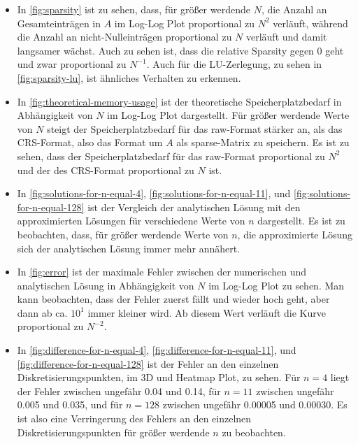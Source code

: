 \documentclass{scrartcl}
\begin{document}
\begin{itemize}
    \item In \autoref{fig:sparsity} ist zu sehen, dass, für größer werdende
          \(N\), die Anzahl an Gesamteinträgen in \(A\) im Log-Log Plot
          proportional zu \(N^2\) verläuft, während die Anzahl an
          nicht-Nulleinträgen proportional zu \(N\) verläuft und damit
          langsamer wächst. Auch zu sehen ist, dass die relative Sparsity gegen
          0 geht und zwar proportional zu \(N^{-1}\). Auch für die
          LU-Zerlegung, zu sehen in \autoref{fig:sparsity-lu}, ist ähnliches
          Verhalten zu erkennen.

    \item In \autoref{fig:theoretical-memory-usage} ist der theoretische
          Speicherplatzbedarf in Abhängigkeit von \(N\) im Log-Log Plot
          dargestellt. Für größer werdende Werte von \(N\) steigt der
          Speicherplatzbedarf für das raw-Format stärker an, als das
          CRS-Format, also das Format um \(A\) als sparse-Matrix zu speichern.
          Es ist zu sehen, dass der Speicherplatzbedarf für das raw-Format
          proportional zu \(N^2\) und der des CRS-Format proportional zu
          \(N\) ist.

    \item In \autoref{fig:solutions-for-n-equal-4},
          \autoref{fig:solutions-for-n-equal-11}, und
          \autoref{fig:solutions-for-n-equal-128} ist der Vergleich der
          analytischen Lösung mit den approximierten Lösungen für verschiedene
          Werte von \(n\) dargestellt. Es ist zu beobachten, dass, für größer
          werdende Werte von \(n\), die approximierte Lösung sich der
          analytischen Lösung immer mehr annähert.

    \item In \autoref{fig:error} ist der maximale Fehler zwischen der
          numerischen und analytischen Lösung in Abhängigkeit von \(N\) im
          Log-Log Plot zu sehen. Man kann beobachten, dass der Fehler zuerst fällt 
          und wieder hoch geht, aber dann ab ca. \(10^{1}\) immer kleiner wird. Ab diesem
          Wert verläuft die Kurve proportional zu \(N^{-2}\).

    \item In \autoref{fig:difference-for-n-equal-4},
          \autoref{fig:difference-for-n-equal-11}, und
          \autoref{fig:difference-for-n-equal-128} ist der Fehler an den
          einzelnen Diskretisierungspunkten, im 3D und Heatmap Plot, zu sehen.
          Für \(n = 4\) liegt der Fehler zwischen ungefähr 0.04 und 0.14, für
          \(n = 11\) zwischen ungefähr 0.005 und 0.035, und für \(n = 128\)
          zwischen ungefähr 0.00005 und 0.00030. Es ist also eine Verringerung
          des Fehlers an den einzelnen Diskretisierungspunkten für größer
          werdende \(n\) zu beobachten.
\end{itemize}
\end{document}
